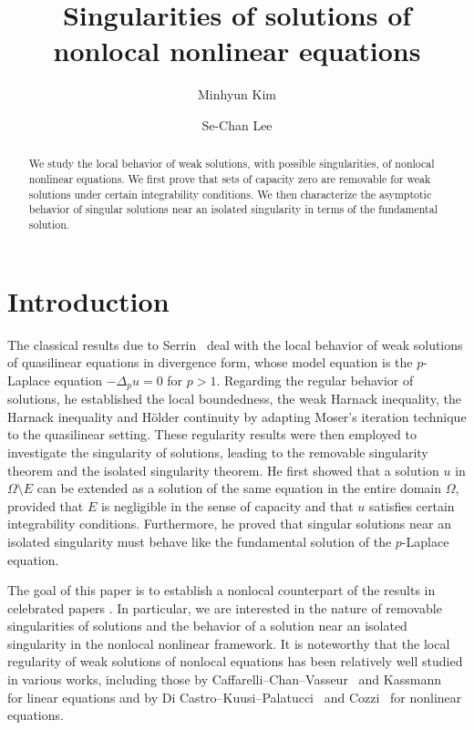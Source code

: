 \documentclass[11pt]{amsart}
\title{Singularities of solutions of nonlocal nonlinear equations}
\author{Minhyun Kim}
\author{Se-Chan Lee}
\theoremstyle{plain}
\theoremstyle{definition}
\numberwithin{equation}{section}
\begin{document}
	\begin{abstract}
		We study the local behavior of weak solutions, with possible singularities, of nonlocal nonlinear equations. We first prove that sets of capacity zero are removable for weak solutions under certain integrability conditions. We then characterize the asymptotic behavior of singular solutions near an isolated singularity in terms of the fundamental solution.
	\end{abstract}
	
	\maketitle
	

	\section{Introduction}

	The classical results due to Serrin~\cite{Ser64, Ser65} deal with the local behavior of weak solutions of quasilinear equations in divergence form, whose model equation is the $p$-Laplace equation $-\Delta_p u=0$ for $p>1$. Regarding the regular behavior of solutions, he established the local boundedness, the weak Harnack inequality, the Harnack inequality and H\"older continuity by adapting Moser's iteration technique \cite{Mos60, Mos61} to the quasilinear setting. These regularity results were then employed to investigate the singularity of solutions, leading to the removable singularity theorem and the isolated singularity theorem. He first showed that a solution $u$ in $\Omega \setminus E$ can be extended as a solution of the same equation in the entire domain $\Omega$, provided that $E$ is negligible in the sense of capacity and that $u$ satisfies certain integrability conditions. Furthermore, he proved that singular solutions near an isolated singularity must behave like the fundamental solution of the $p$-Laplace equation. 
	
	
	The goal of this paper is to establish a nonlocal counterpart of the results in celebrated papers \cite{Ser64, Ser65}. In particular, we are interested in the nature of removable singularities of solutions and the behavior of a solution near an isolated singularity in the nonlocal nonlinear framework. It is noteworthy that the local regularity of weak solutions of nonlocal equations has been relatively well studied in various works, including those by Caffarelli--Chan--Vasseur~\cite{CCV11} and Kassmann~\cite{Kas09} for linear equations and by Di Castro--Kuusi--Palatucci~\cite{DCKP14, DCKP16} and Cozzi~\cite{Coz17} for nonlinear equations.
	
\end{document}
